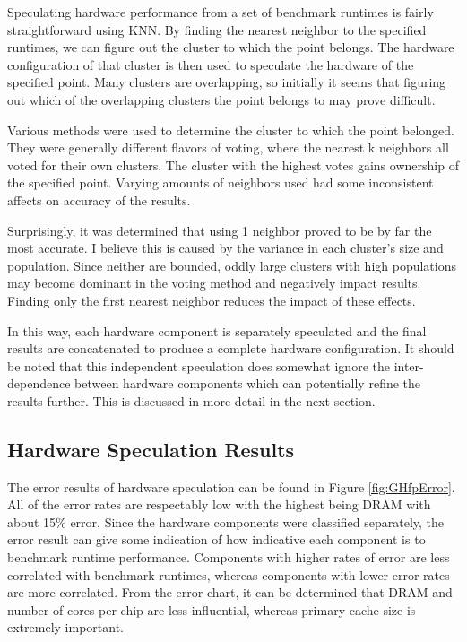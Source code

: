 \documentclass[10pt,twocolumn,letterpaper]{article}
\begin{document}
Speculating hardware performance from a set of benchmark runtimes is fairly straightforward using KNN.
By finding the nearest neighbor to the specified runtimes, we can figure out the cluster to which the point belongs.
The hardware configuration of that cluster is then used to speculate the hardware of the specified point.
Many clusters are overlapping, so initially it seems that figuring out which of the overlapping clusters the point belongs to may prove difficult.

Various methods were used to determine the cluster to which the point belonged.
They were generally different flavors of voting, where the nearest k neighbors all voted for their own clusters.
The cluster with the highest votes gains ownership of the specified point.
Varying amounts of neighbors used had some inconsistent affects on accuracy of the results.

Surprisingly, it was determined that using 1 neighbor proved to be by far the most accurate.
I believe this is caused by the variance in each cluster’s size and population.
Since neither are bounded, oddly large clusters with high populations may become dominant in the voting method and negatively impact results.
Finding only the first nearest neighbor reduces the impact of these effects. 

In this way, each hardware component is separately speculated and the final results are concatenated to produce a complete hardware configuration.
It should be noted that this independent speculation does somewhat ignore the inter-dependence between hardware components which can potentially refine the results further.
This is discussed in more detail in the next section.

\subsection{Hardware Speculation Results}

The error results of hardware speculation can be found in Figure \ref{fig:GHfpError}.
All of the error rates are respectably low with the highest being DRAM with about 15\% error.
Since the hardware components were classified separately, the error result can give some indication of how indicative each component is to benchmark runtime performance.
Components with higher rates of error are less correlated with benchmark runtimes, whereas components with lower error rates are more correlated.
From the error chart, it can be determined that DRAM and number of cores per chip are less influential, whereas primary cache size is extremely important.
\end{document}
